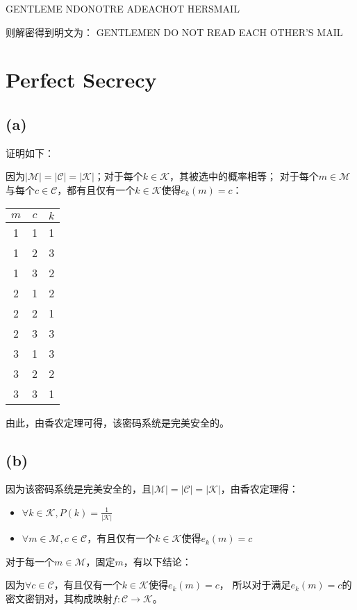 \documentclass[twoside,11pt]{article}
\begin{document}
GENTLEME NDONOTRE ADEACHOT HERSMAIL

则解密得到明文为：
GENTLEMEN DO NOT READ EACH OTHER'S MAIL

\section{Perfect Secrecy}
\subsection*{(a)}
证明如下：

因为$|\mathcal{M}| = |\mathcal{C}| = |\mathcal{K}|$；对于每个$k \in \mathcal{K}$，其被选中的概率相等；
对于每个$m \in \mathcal{M}$与每个$c \in \mathcal{C}$，都有且仅有一个$k \in \mathcal{K}$使得$e_k(m) = c$：

\begin{tabular}{|c|c|c|}
    \hline
    $m$ & $c$ & $k$ \\
    \hline
    1   & 1   & 1   \\
    1   & 2   & 3   \\
    1   & 3   & 2   \\
    2   & 1   & 2   \\
    2   & 2   & 1   \\
    2   & 3   & 3   \\
    3   & 1   & 3   \\
    3   & 2   & 2   \\
    3   & 3   & 1   \\
    \hline
\end{tabular}

由此，由香农定理可得，该密码系统是完美安全的。

\subsection*{(b)}
因为该密码系统是完美安全的，且$|\mathcal{M}| = |\mathcal{C}| = |\mathcal{K}|$，由香农定理得：
\begin{itemize}
    \item $\forall k \in \mathcal{K}, P(k)=\frac{1}{|\mathcal{K}|}$
    \item $\forall m \in \mathcal{M}, c \in \mathcal{C}$，有且仅有一个$k \in \mathcal{K}$使得$e_k(m) = c$
\end{itemize}

对于每一个$m \in \mathcal{M}$，固定$m$，有以下结论：

因为$\forall c \in \mathcal{C}$，有且仅有一个$k \in \mathcal{K}$使得$e_k(m) = c$，
所以对于满足$e_k(m) = c$的密文密钥对，其构成映射$f: \mathcal{C} \to \mathcal{K}$。
\end{document}
